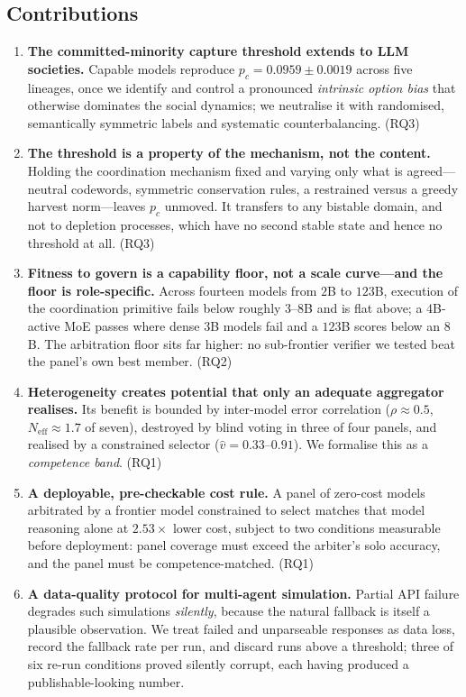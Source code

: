 \documentclass[manuscript,screen,review]{acmart}
\begin{document}
\subsection{Contributions}
\begin{enumerate}[leftmargin=1.3em,itemsep=2pt]
\item \textbf{The committed-minority capture threshold extends to LLM societies.}
Capable models reproduce $p_c=0.0959\pm0.0019$ across five lineages, once we
identify and control a pronounced \emph{intrinsic option bias} that otherwise
dominates the social dynamics; we neutralise it with randomised, semantically
symmetric labels and systematic counterbalancing. (RQ3)

\item \textbf{The threshold is a property of the mechanism, not the content.}
Holding the coordination mechanism fixed and varying only what is agreed---neutral
codewords, symmetric conservation rules, a restrained versus a greedy harvest
norm---leaves $p_c$ unmoved. It transfers to any bistable domain, and not to
depletion processes, which have no second stable state and hence no threshold at
all. (RQ3)

\item \textbf{Fitness to govern is a capability floor, not a scale curve---and the
floor is role-specific.} Across fourteen models from $2$B to $123$B, execution of
the coordination primitive fails below roughly $3$--$8$B and is flat above; a
$4$B-active MoE passes where dense $3$B models fail and a $123$B scores below an
$8$B. The arbitration floor sits far higher: no sub-frontier verifier we tested
beat the panel's own best member. (RQ2)

\item \textbf{Heterogeneity creates potential that only an adequate aggregator
realises.} Its benefit is bounded by inter-model error correlation
($\rho\approx0.5$, $N_{\mathrm{eff}}\approx1.7$ of seven), destroyed by blind
voting in three of four panels, and realised by a constrained selector
($\hat v=0.33$--$0.91$). We formalise this as a \emph{competence band}. (RQ1)

\item \textbf{A deployable, pre-checkable cost rule.} A panel of zero-cost models
arbitrated by a frontier model constrained to select matches that model reasoning
alone at $2.53\times$ lower cost, subject to two conditions measurable before
deployment: panel coverage must exceed the arbiter's solo accuracy, and the panel
must be competence-matched. (RQ1)

\item \textbf{A data-quality protocol for multi-agent simulation.} Partial API
failure degrades such simulations \emph{silently}, because the natural fallback is
itself a plausible observation. We treat failed and unparseable responses as data
loss, record the fallback rate per run, and discard runs above a threshold; three
of six re-run conditions proved silently corrupt, each having produced a
publishable-looking number.
\end{enumerate}
\end{document}
